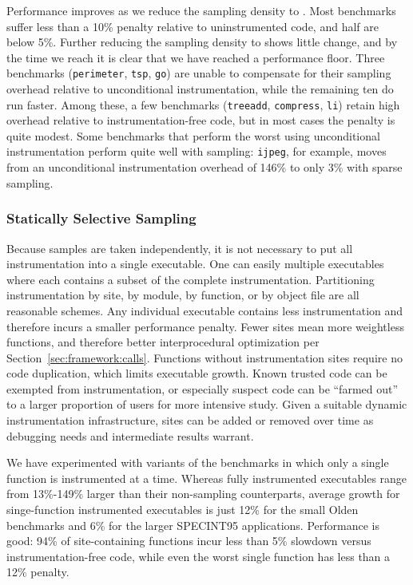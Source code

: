 Performance improves as we reduce the sampling density to
.  Most benchmarks suffer less than a 10\% penalty
relative to uninstrumented code, and half are below 5\%.  Further
reducing the sampling density to  shows little
change, and by the time we reach  it is clear
that we have reached a performance floor.  Three benchmarks
(\texttt{perimeter}, \texttt{tsp}, \texttt{go}) are unable to
compensate for their sampling overhead relative to unconditional
instrumentation, while the remaining ten do run faster.  Among these,
a few benchmarks (\texttt{treeadd}, \texttt{compress}, \texttt{li})
retain high overhead relative to instrumentation-free code, but in
most cases the penalty is quite modest.  Some benchmarks that perform
the worst using unconditional instrumentation perform quite well with
sampling: \texttt{ijpeg}, for example, moves from an unconditional
instrumentation overhead of 146\% to only 3\% with sparse sampling.

\subsubsection{Statically Selective Sampling}
\label{sec:ccured:single}

Because samples are taken independently, it is not necessary to put
all instrumentation into a single executable.  One can easily 
multiple executables where each contains a subset of the complete
instrumentation.  Partitioning instrumentation by site, by module, by
function, or by object file are all reasonable schemes.  Any
individual executable contains less instrumentation and therefore
incurs a smaller performance penalty.  Fewer sites mean more
weightless functions, and therefore better interprocedural
optimization per Section~\ref{sec:framework:calls}.  Functions without
instrumentation sites require no code duplication, which limits
executable growth.  Known trusted code can be exempted from
instrumentation, or especially suspect code can be ``farmed out'' to a
larger proportion of users for more intensive study.  Given a suitable
dynamic instrumentation infrastructure, sites can be added or removed
over time as debugging needs and intermediate results warrant.

\begin{sloppypar}
  We have experimented with variants of the \CCured benchmarks in
  which only a single function is instrumented at a time.  Whereas
  fully instrumented executables range from 13\%-149\% larger than
  their non-sampling counterparts, average growth for singe-function
  instrumented executables is just 12\% for the small Olden benchmarks
  and 6\% for the larger SPECINT95 applications.  Performance is good:
  94\% of site-containing functions incur less than 5\% slowdown
  versus instrumentation-free code, while even the worst single
  function has less than a 12\% penalty.
\end{sloppypar}

